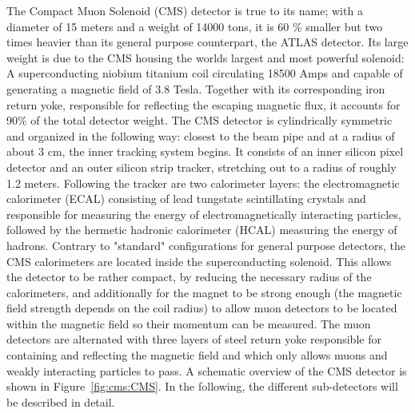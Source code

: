 The Compact Muon Solenoid (CMS) detector is true to its name; with a diameter of 15 meters and a weight of 14000 tons, it is 60 \% smaller but two times heavier than its general purpose counterpart, the ATLAS detector.
Its large weight is due to the CMS housing the worlds largest and most powerful solenoid: A superconducting niobium titanium coil circulating 18500 Amps and capable of generating a magnetic field of 3.8 Tesla. Together with its corresponding iron return yoke, responsible for reflecting the escaping magnetic flux, it accounts for 90\% of the total detector weight.
The CMS detector is cylindrically symmetric and organized in the following way: closest to the beam pipe and at a radius of about 3 cm, the inner tracking system begins. It consists of an inner silicon pixel detector and an outer silicon strip tracker, stretching out to a radius of roughly 1.2 meters. Following the tracker are two calorimeter layers: the electromagnetic calorimeter (ECAL) consisting of lead tungstate scintillating crystals and responsible for measuring the energy of electromagnetically interacting particles, followed by the hermetic hadronic calorimeter (HCAL) measuring the energy of hadrons.
Contrary to "standard" configurations for general purpose detectors, the CMS calorimeters are located inside the superconducting solenoid. This allows the detector to be rather compact, by reducing the necessary radius of the calorimeters, and additionally for the magnet to be strong enough (the magnetic field strength depends on the coil radius) to allow muon detectors to be located within the magnetic field so their momentum can be measured.
The muon detectors are alternated with three layers of steel return yoke responsible for containing and reflecting the magnetic field and which only allows muons and weakly interacting particles to pass. A schematic overview of the CMS detector is shown in Figure~\ref{fig:cms:CMS}. In the following, the different sub-detectors will be described in detail.

